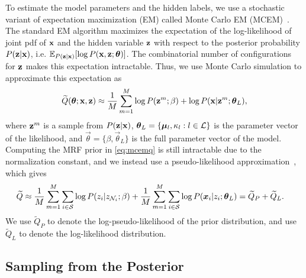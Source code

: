 \documentclass[runningheads, a4paper]{llncs}
\begin{document}
To estimate the model parameters and the hidden labels, we use a
stochastic variant of expectation maximization (EM) called Monte Carlo
EM (MCEM)~\cite{wei1990monte}. The standard EM algorithm maximizes the
expectation of the log-likelihood of joint pdf of $\text{\bf x}$ and the
hidden variable $\text{\bf z}$ with respect to the posterior probability
$P(\text{\bf z} | \text{\bf x})$, i.e. $\mathbb{E}_{P(\mat z| \mat x)} [\log
  P(\mat x, \mat z; \vec \theta)]$. The combinatorial number of
configurations for $\text{\bf z}$ makes this expectation intractable. Thus, we
use Monte Carlo simulation to approximate this expectation as
\begin{equation}
  \widetilde Q(\vec \theta; \mat x, \mat z)
  \approx
  \frac
  {1}
  {M}
  \sum_{m=1}^{M}
    \log
    P (\mat z^m; \beta)
    +
    \log
    P (\mat x | \mat z^m; \vec \theta_L),
  \label{eq:mcemq}
\end{equation}
where $\text{\bf z}^m$ is a sample from $P(\text{\bf z} | \text{\bf x})$, $\vec \theta_L = \{\vec
\mu_l, \kappa_l : l \in \cL\}$ is the parameter vector of the likelihood, and
$\vec \theta=\{\beta, \vec \theta_L\}$ is the full parameter vector of the
model. Computing the MRF prior in \eqref{eq:mcemq} is still intractable due to
the normalization constant, and we instead use a pseudo-likelihood
approximation~\cite{LiBook}, which gives
\begin{align*}
\centering
  \widetilde Q
  &
  \approx
  \frac{1}{M}
  \sum_{m=1}^{M}
  \sum_{i \in \cS}
  \log P(z_i | z_{\cN_i}; \beta)
  +
  \frac{1}{M}
  \sum_{m=1}^{M}
  \sum_{i \in \cS}
  \log
  P(\vec x_i | z_i; \vec \theta_L)
  =
  \widetilde Q_P
  +
  \widetilde Q_L.
\end{align*}
We use $\widetilde Q_P$ to denote the log-pseudo-likelihood of the prior
distribution, and use $\widetilde Q_L$ to denote the log-likelihood
distribution.


\subsection{Sampling from the Posterior}
\end{document}
